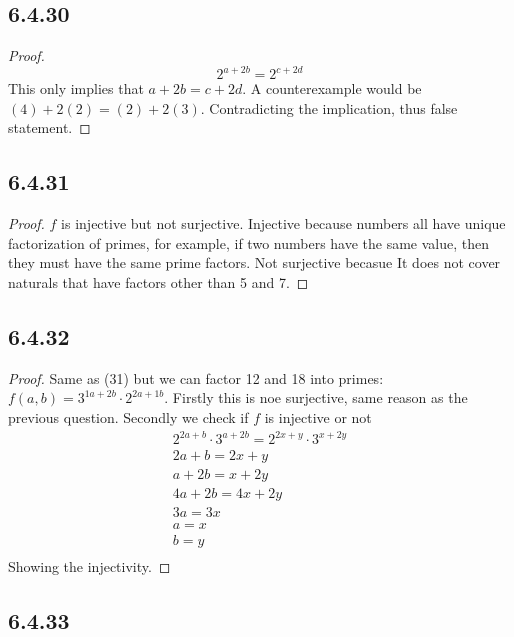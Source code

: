 \documentclass{article}
\begin{document}
\subsection*{6.4.30}


\begin{proof}
    $$2^{a+2b}=2^{c+2d}$$ This only implies that $a+2b=c+2d.$ A counterexample would be $(4)+2(2)=(2)+2(3).$ Contradicting the implication, thus false statement. 
\end{proof}

\subsection*{6.4.31}


\begin{proof}
    $f$ is injective but not surjective. Injective because numbers all have unique factorization of primes, for example, if two numbers have the same value, then they must have the same prime factors. Not surjective becasue It does not cover naturals that have factors other than 5 and 7. 
\end{proof}

\subsection*{6.4.32}


\begin{proof}
    Same as (31) but we can factor 12 and 18 into primes: $f(a,b)=3^{1a+2b}\cdot2^{2a+1b}$. Firstly this is noe surjective, same reason as the previous question. Secondly we check if $f$ is injective or not \begin{gather*}
        2^{2a+b}\cdot3^{a+2b}=2^{2x+y}\cdot3^{x+2y}\\
        2a+b=2x+y\\
        a+2b=x+2y\\
        4a+2b=4x+2y\\
        3a=3x\\
        a=x\\
        b=y\\
    \end{gather*} 
    Showing the injectivity. 
\end{proof}

\subsection*{6.4.33}
\end{document}
